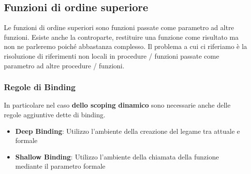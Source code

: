 \documentclass[a4paper]{article}
\begin{document}
\subsection{Funzioni di ordine superiore}

Le funzioni di ordine superiori sono funzioni passate come parametro ad altre funzioni.
Esiste anche la controparte, restituire una funzione come risultato ma non 
ne parleremo poiché abbastanza complesso.
Il problema a cui ci riferiamo è la risoluzione di riferimenti non locali 
in procedure / funzioni passate come parametro ad altre procedure / funzioni.

\subsubsection{Regole di Binding}

In particolare nel caso \textbf{dello scoping dinamico} sono necessarie anche delle
regole aggiuntive dette di binding.

\begin{itemize}
  \item \textbf{Deep Binding}: Utilizzo l'ambiente della creazione del legame tra attuale e formale
  \item \textbf{Shallow Binding}: Utilizzo l'ambiente della chiamata della funzione mediante il parametro formale 
\end{itemize}
\end{document}
